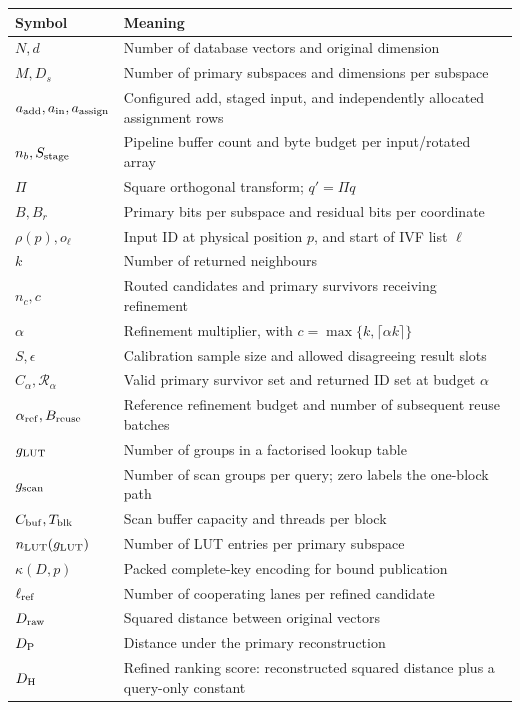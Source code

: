 \begingroup\small{}
\begin{longtable}{@{}>{\raggedright\arraybackslash}p{.25\linewidth}>{\raggedright\arraybackslash}p{.70\linewidth}@{}}
\toprule
Symbol & Meaning \\
\midrule
$N,d$ & Number of database vectors and original dimension \\
$M,D_s$ & Number of primary subspaces and dimensions per subspace \\
$a_{\rm add},a_{\rm in},a_{\rm assign}$ & Configured add, staged input, and independently allocated assignment rows \\
$n_b,S_{\rm stage}$ & Pipeline buffer count and byte budget per input/rotated array \\
$\Pi$ & Square orthogonal transform; $q'=\Pi q$ \\
$B,B_r$ & Primary bits per subspace and residual bits per coordinate \\
$\rho(p),o_\ell$ & Input ID at physical position $p$, and start of IVF list $\ell$ \\
$k$ & Number of returned neighbours \\
$n_c,c$ & Routed candidates and primary survivors receiving refinement \\
$\alpha$ & Refinement multiplier, with $c=\max\{k,\lceil\alpha k\rceil\}$ \\
$S,\epsilon$ & Calibration sample size and allowed disagreeing result slots \\
$C_\alpha,\mathcal R_\alpha$ & Valid primary survivor set and returned ID set at budget $\alpha$ \\
$\alpha_{\rm ref},B_{\rm reuse}$ & Reference refinement budget and number of subsequent reuse batches \\
$g_{\mathrm{LUT}}$ & Number of groups in a factorised lookup table \\
$g_{\mathrm{scan}}$ & Number of scan groups per query; zero labels the one-block path \\
$C_{\rm buf},T_{\rm blk}$ & Scan buffer capacity and threads per block \\
$n_{\rm LUT}(g_{\mathrm{LUT}})$ & Number of LUT entries per primary subspace \\
$\kappa(D,p)$ & Packed complete-key encoding for bound publication \\
$\ell_{\mathrm{ref}}$ & Number of cooperating lanes per refined candidate \\
$D_{\mathrm{raw}}$ & Squared distance between original vectors \\
$D_{\mathrm{P}}$ & Distance under the primary reconstruction \\
$D_{\mathrm{H}}$ & Refined ranking score: reconstructed squared distance plus a query-only constant \\
\bottomrule
\end{longtable}

